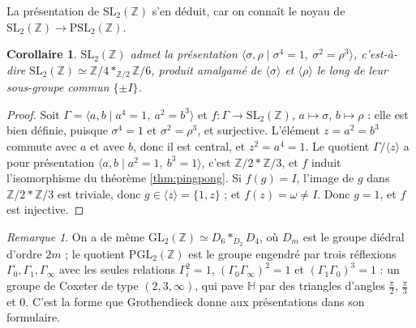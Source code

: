 \documentclass[11pt,a4paper]{article}
\theoremstyle{plain}
\newtheorem{corollaire}[theoreme]{Corollaire}
\theoremstyle{definition}
\theoremstyle{remark}
\newtheorem{remarque}[theoreme]{Remarque}
\newcommand{\Z}{\mathbb{Z}}
\newcommand{\Hp}{\mathbb{H}}
\newcommand{\SL}{\mathrm{SL}}
\newcommand{\GL}{\mathrm{GL}}
\newcommand{\PSL}{\mathrm{PSL}}
\begin{document}
La présentation de $\SL_2(\Z)$ s'en déduit, car on connaît le noyau de $\SL_2(\Z)\to\PSL_2(\Z)$.

\begin{corollaire}\label{cor:presentation}
$\SL_2(\Z)$ admet la présentation $\langle\sigma,\rho\mid\sigma^4=1,\ \sigma^2=\rho^3\rangle$, c'est-à-dire $\SL_2(\Z)\simeq\Z/4*_{\Z/2}\Z/6$, produit amalgamé de $\langle\sigma\rangle$ et $\langle\rho\rangle$ le long de leur sous-groupe commun $\{\pm I\}$.
\end{corollaire}

\begin{proof}
Soit $\Gamma=\langle a,b\mid a^4=1,\ a^2=b^3\rangle$ et $f:\Gamma\to\SL_2(\Z)$, $a\mapsto\sigma$, $b\mapsto\rho$ : elle est bien définie, puisque $\sigma^4=1$ et $\sigma^2=\rho^3$, et surjective. L'élément $z=a^2=b^3$ commute avec $a$ et avec $b$, donc il est central, et $z^2=a^4=1$. Le quotient $\Gamma/\langle z\rangle$ a pour présentation $\langle a,b\mid a^2=1,\ b^3=1\rangle$, c'est $\Z/2*\Z/3$, et $f$ induit l'isomorphisme du théorème \ref{thm:pingpong}. Si $f(g)=I$, l'image de $g$ dans $\Z/2*\Z/3$ est triviale, donc $g\in\langle z\rangle=\{1,z\}$ ; et $f(z)=\omega\neq I$. Donc $g=1$, et $f$ est injective.
\end{proof}

\begin{remarque}
On a de même $\GL_2(\Z)\simeq D_6*_{D_2}D_4$, où $D_m$ est le groupe diédral d'ordre $2m$ ; le quotient $\mathrm{PGL}_2(\Z)$ est le groupe engendré par trois réflexions $\Gamma_0,\Gamma_1,\Gamma_\infty$ avec les seules relations $\Gamma_i^2=1$, $(\Gamma_0\Gamma_\infty)^2=1$ et $(\Gamma_1\Gamma_0)^3=1$ : un groupe de Coxeter de type $(2,3,\infty)$, qui pave $\Hp$ par des triangles d'angles $\frac\pi2$, $\frac\pi3$ et $0$. C'est la forme que Grothendieck donne aux présentations dans son formulaire.
\end{remarque}
\end{document}
